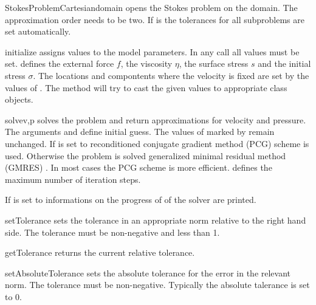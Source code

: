 \begin{classdesc}{StokesProblemCartesian}{domain}
opens the Stokes problem on the \Domain domain. The approximation
order needs to be two.
If  is \True 
the tolerances for all subproblems are set automatically.
\end{classdesc}

\begin{methoddesc}[StokesProblemCartesian]{initialize}{}
assigns values to the model parameters. In any call all values must be set.
 defines the external force $f$,  the viscosity $\eta$,
 the surface stress $s$ and  the initial stress $\sigma$.
The locations and compontents where the velocity is fixed are set by 
the values of . The method will try to cast the given values to appropriate 
\Data class objects.
\end{methoddesc}

\begin{methoddesc}[StokesProblemCartesian]{solve}{v,p
}
solves the problem and return approximations for velocity and pressure. 
The arguments  and  define initial guess. The values of  marked
by  remain unchanged. 
If  is set to \True 
reconditioned conjugate gradient method (PCG)   scheme is used. Otherwise the problem is solved generalized minimal residual method (GMRES) . In most cases 
the PCG scheme is more efficient.
 defines the maximum number of iteration steps. 

If  is set to \True informations on the progress of of the solver are printed.
\end{methoddesc}


\begin{methoddesc}[StokesProblemCartesian]{setTolerance}{}
sets the tolerance in an appropriate norm relative to the right hand side. The tolerance must be non-negative and less than 1.
\end{methoddesc}
\begin{methoddesc}[StokesProblemCartesian]{getTolerance}{}
returns the current relative tolerance.
\end{methoddesc}
\begin{methoddesc}[StokesProblemCartesian]{setAbsoluteTolerance}{}
sets the absolute tolerance for the error in the relevant norm. The tolerance must be non-negative. Typically the
absolute talerance is set to 0.
\end{methoddesc}

